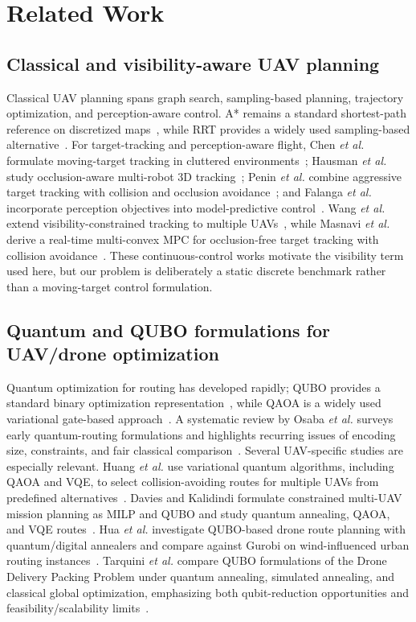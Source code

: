 \documentclass[10pt,conference]{IEEEtran}
\begin{document}
\section{Related Work}
\subsection{Classical and visibility-aware UAV planning}
Classical UAV planning spans graph search, sampling-based planning, trajectory optimization, and perception-aware control. A* remains a standard shortest-path reference on discretized maps~\cite{hart1968}, while RRT provides a widely used sampling-based alternative~\cite{lavalle1998}. For target-tracking and perception-aware flight, Chen \emph{et al.} formulate moving-target tracking in cluttered environments~\cite{chen2016}; Hausman \emph{et al.} study occlusion-aware multi-robot 3D tracking~\cite{hausman2016}; Penin \emph{et al.} combine aggressive target tracking with collision and occlusion avoidance~\cite{penin2018}; and Falanga \emph{et al.} incorporate perception objectives into model-predictive control~\cite{falanga2018}. Wang \emph{et al.} extend visibility-constrained tracking to multiple UAVs~\cite{wang2022}, while Masnavi \emph{et al.} derive a real-time multi-convex MPC for occlusion-free target tracking with collision avoidance~\cite{masnavi2022}. These continuous-control works motivate the visibility term used here, but our problem is deliberately a static discrete benchmark rather than a moving-target control formulation.

\subsection{Quantum and QUBO formulations for UAV/drone optimization}
Quantum optimization for routing has developed rapidly; QUBO provides a standard binary optimization representation~\cite{glover2019}, while QAOA is a widely used variational gate-based approach~\cite{farhi2014}. A systematic review by Osaba \emph{et al.} surveys early quantum-routing formulations and highlights recurring issues of encoding size, constraints, and fair classical comparison~\cite{osaba2022review}. Several UAV-specific studies are especially relevant. Huang \emph{et al.} use variational quantum algorithms, including QAOA and VQE, to select collision-avoiding routes for multiple UAVs from predefined alternatives~\cite{huang2022}. Davies and Kalidindi formulate constrained multi-UAV mission planning as MILP and QUBO and study quantum annealing, QAOA, and VQE routes~\cite{davies2024}. Hua \emph{et al.} investigate QUBO-based drone route planning with quantum/digital annealers and compare against Gurobi on wind-influenced urban routing instances~\cite{hua2024}. Tarquini \emph{et al.} compare QUBO formulations of the Drone Delivery Packing Problem under quantum annealing, simulated annealing, and classical global optimization, emphasizing both qubit-reduction opportunities and feasibility/scalability limits~\cite{tarquini2026}.
\end{document}
